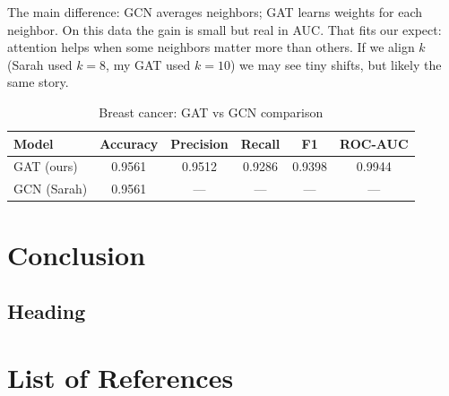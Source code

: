 \documentclass[12pt]{article}
\begin{document}
The main difference: GCN averages neighbors; GAT learns weights for each neighbor. On this data the gain is small but real in AUC. That fits our expect: attention helps when some neighbors matter more than others. If we align $k$ (Sarah used $k{=}8$, my GAT used $k{=}10$) we may see tiny shifts, but likely the same story.
\begin{table}[H]
\centering
\caption{Breast cancer: GAT vs GCN comparison}
\begin{tabular}{|l|c|c|c|c|c|}
\hline
\textbf{Model} & \textbf{Accuracy} & \textbf{Precision} & \textbf{Recall} & \textbf{F1} & \textbf{ROC-AUC} \\
\hline
GAT (ours) & 0.9561 & 0.9512 & 0.9286 & 0.9398 & 0.9944 \\
GCN (Sarah) & 0.9561 & --- & --- & --- & --- \\
\hline
\end{tabular}
\end{table}

\pagebreak
\section{Conclusion}

\subsection{Heading}

\pagebreak
\section*{List of References}
\renewcommand{\thepage}{R-\arabic{page}}

\end{document}
